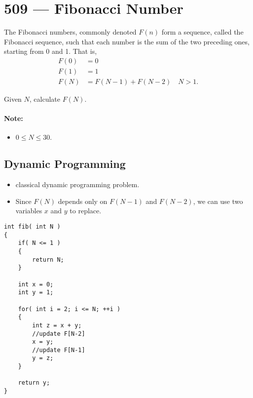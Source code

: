 \section{509 --- Fibonacci Number}
The Fibonacci numbers, commonly denoted $F(n)$ form a sequence, called the Fibonacci sequence, such that each number is the sum of the two preceding ones, starting from 0 and 1. That is,
\begin{align*}
F(0) &= 0 \\
F(1) &= 1 \\
F(N) &= F(N - 1) + F(N - 2) \quad N > 1.
\end{align*}

Given $N$, calculate $F(N)$.

\paragraph{Note:}

\begin{itemize}
\item $0 \leq N \leq 30$.
\end{itemize}

\subsection{Dynamic Programming}
\begin{itemize}
\item classical dynamic programming problem.
\item Since $F(N)$ depends only on $F(N-1)$ and $F(N-2)$, we can use two variables $x$ and $y$ to replace.
\end{itemize}

\setcounter{lstlisting}{0}
\begin{lstlisting}[style=customc, caption={Dynamic Programming}]
int fib( int N )
{
    if( N <= 1 )
    {
        return N;
    }

    int x = 0;
    int y = 1;

    for( int i = 2; i <= N; ++i )
    {
        int z = x + y;
        //update F[N-2]
        x = y;
        //update F[N-1]
        y = z;
    }

    return y;
}
\end{lstlisting}